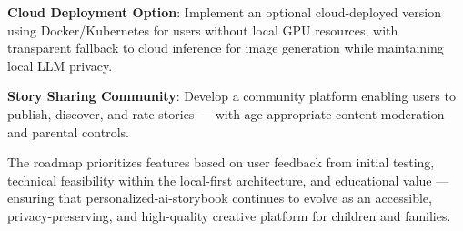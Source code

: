 \textbf{Cloud Deployment Option}: Implement an optional cloud-deployed version using Docker/Kubernetes for users without local GPU resources, with transparent fallback to cloud inference for image generation while maintaining local LLM privacy.

\textbf{Story Sharing Community}: Develop a community platform enabling users to publish, discover, and rate stories — with age-appropriate content moderation and parental controls.

The roadmap prioritizes features based on user feedback from initial testing, technical feasibility within the local-first architecture, and educational value — ensuring that personalized-ai-storybook continues to evolve as an accessible, privacy-preserving, and high-quality creative platform for children and families.

